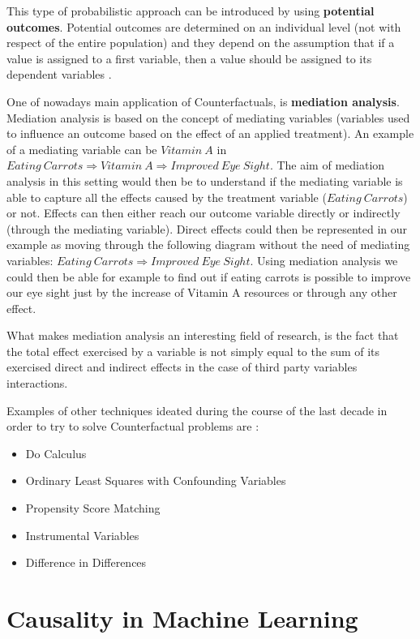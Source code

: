 This type of probabilistic approach can be introduced by using \textbf{potential outcomes}. Potential outcomes are determined on an individual level (not with respect of the entire population) and they depend on the assumption that if a value is assigned to a first variable, then a value should be assigned to its dependent variables \cite{why}.

One of nowadays main application of Counterfactuals, is \textbf{mediation analysis}. Mediation analysis is based on the concept of mediating variables (variables used to influence an outcome based on the effect of an applied treatment). An example of a mediating variable can be $Vitamin\:A$ in $Eating\:Carrots \Rightarrow Vitamin\:A \Rightarrow Improved\:Eye\:Sight$. The aim of mediation analysis in this setting would then be to understand if the mediating variable is able to capture all the effects caused by the treatment variable ($Eating\:Carrots$) or not. Effects can then either reach our outcome variable directly or indirectly (through the mediating variable). Direct effects could then be represented in our example as moving through the following diagram without the need of mediating variables: $Eating\:Carrots \Rightarrow Improved\:Eye\:Sight$. Using mediation analysis we could then be able for example to find out if eating carrots is possible to improve our eye sight just by the increase of Vitamin A resources or through any other effect.

What makes mediation analysis an interesting field of research, is the fact that the total effect exercised by a variable is not simply equal to the sum of its exercised direct and indirect effects in the case of third party variables interactions.

Examples of other techniques ideated during the course of the last decade in order to try to solve Counterfactual problems are \cite{eva}:

\begin{itemize}
    \item Do Calculus
    \item Ordinary Least Squares with Confounding Variables
    \item Propensity Score Matching
    \item Instrumental Variables
    \item Difference in Differences
\end{itemize}

\section{Causality in Machine Learning}

